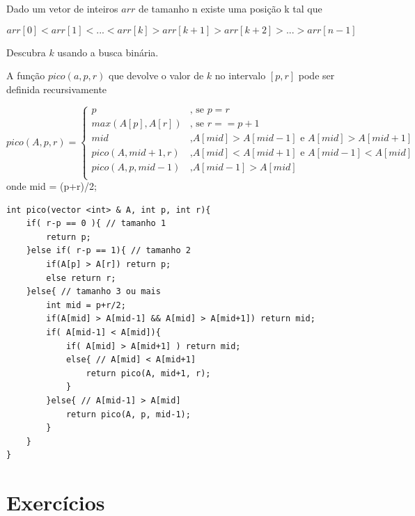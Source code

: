\begin{exemplo}
Dado um vetor de inteiros $arr$ de tamanho n existe uma posição k tal que 

$$arr[0] < arr[1] < ... < arr[k] > arr[k+1] > arr[k+2] > ... > arr[n-1]$$

Descubra $k$ usando a busca binária.

A função $pico(a, p, r)$ que devolve o valor de $k$ no intervalo $[p,r]$ pode ser definida recursivamente

\begin{equation}
pico(A, p, r) = 
\begin{cases}
  p  & \text{, se } p = r\\
  max(A[p],A[r]) & \text{, se } r == p+1 \\
  mid & \text{,} A[mid] > A[mid-1] \text{ e } A[mid] > A[mid+1]  \\
  pico(A, mid+1,r)      & \text{,} A[mid] < A[mid+1] \text{ e } A[mid-1] < A[mid]   \\
  pico(A, p,mid-1)      & \text{,} A[mid-1] > A[mid]    \\
\end{cases}
\nonumber 
\end{equation}
onde mid = (p+r)/2;


\begin{verbatim}
int pico(vector <int> & A, int p, int r){
    if( r-p == 0 ){ // tamanho 1
        return p;
    }else if( r-p == 1){ // tamanho 2 
        if(A[p] > A[r]) return p;
        else return r;
    }else{ // tamanho 3 ou mais
        int mid = p+r/2;
        if(A[mid] > A[mid-1] && A[mid] > A[mid+1]) return mid;
        if( A[mid-1] < A[mid]){
            if( A[mid] > A[mid+1] ) return mid;
            else{ // A[mid] < A[mid+1]
                return pico(A, mid+1, r);
            }
        }else{ // A[mid-1] > A[mid]  
            return pico(A, p, mid-1);
        }    
    }
}

\end{verbatim}
    
\end{exemplo}



\section{Exercícios}


